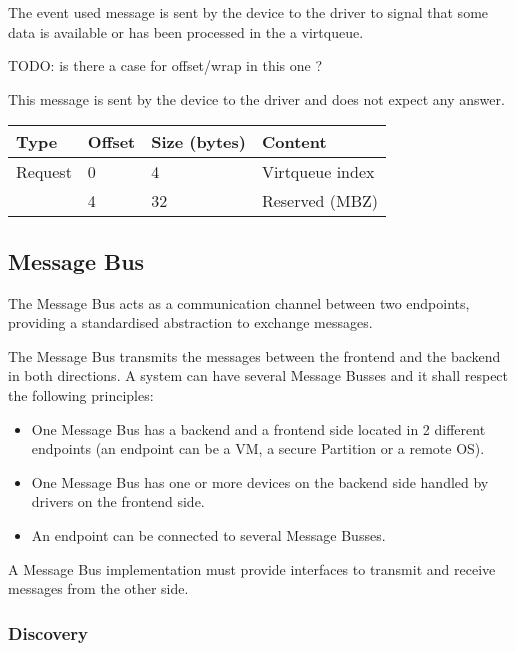 
The event used message is sent by the device to the driver to signal that some
data is available or has been processed in the a virtqueue.

TODO: is there a case for offset/wrap in this one ?

This message is sent by the device to the driver and does not expect any
answer.

\begin{tabular}{|l|l|l|l|}
\hline
Type & Offset & Size (bytes) & Content \\
\hline \hline
Request & 0 & 4 & Virtqueue index \\
& 4 & 32 & Reserved (MBZ) \\
\hline
\end{tabular}

\subsection{Message Bus}\label{sec:Virtio Transport Options / Virtio Over Messages / Message Bus}

The Message Bus acts as a communication channel between two endpoints,
providing a standardised abstraction to exchange messages.

The Message Bus transmits the messages between the frontend and the backend in
both directions.
A system can have several Message Busses and it shall respect the following
principles:

\begin{itemize}
\item One Message Bus has a backend and a frontend side located in 2 different
      endpoints (an endpoint can be a VM, a secure Partition or a remote OS).
\item One Message Bus has one or more devices on the backend side handled by
      drivers on the frontend side.
\item An endpoint can be connected to several Message Busses.
\end{itemize}

A Message Bus implementation must provide interfaces to transmit and receive
messages from the other side.

\subsubsection{Discovery}\label{sec:Virtio Transport Options / Virtio Over Messages / Message Bus / Discovery}

